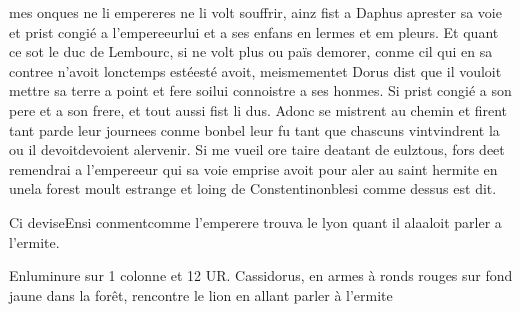 \documentclass{article}
\begin{document}
\begin{pages}
   mes onques ne li empereres ne li volt souffrir, 
   ainz fist a Daphus aprester sa voie et prist congié a 
   l’empereeurlui et a ses enfans 
   en lermes et em pleurs. Et quant ce sot le duc de Lembourc, si ne volt plus ou païs demorer, 
   conme cil qui en sa contree n’avoit lonctemps 
      estéesté avoit, 
   meismementet Dorus 
   dist que il vouloit mettre sa terre a point et fere 
      soilui connoistre a ses honmes. 
   Si prist congié a son pere et a son frere, 
   et tout aussi fist li dus. Adonc se mistrent au chemin et 
   firent tant parde 
      leur journees conme 
      bonbel leur fu tant que chascuns 
   vintvindrent la ou il 
   devoitdevoient alervenir. 
   Si me vueil ore taire 
      deatant de eulztous, 
      fors deet remendrai a 
   l’empereeur qui sa voie emprise avoit pour aler au 
   saint hermite en unela 
   forest 
      moult estrange et loing de 
         Constentinonblesi comme dessus est dit. \pend
         
         
            Ci deviseEnsi 
               conmentcomme 
               l’emperere 
               trouva le lyon quant il
               alaaloit 
               parler a l’ermite.
            
               Enluminure sur 1 colonne et 12 UR. 
                  Cassidorus, en armes à ronds rouges sur 
                  fond jaune dans la forêt, rencontre le lion 
                  en allant parler à l’ermite
               

\end{pages}
\end{document}
